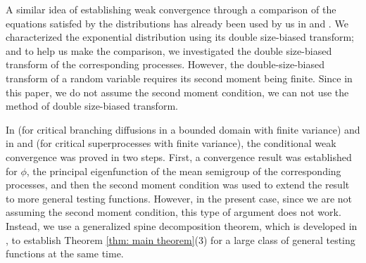 \documentclass[12pt, a4paper]{amsart}
\theoremstyle{definition}
\numberwithin{equation}{section}
\begin{document}
	A similar idea of establishing weak convergence through a comparison of the equations satisfed by the distributions has already been used by us in \cite{RenSongSun2017A-2-spine} and \cite{RenSongSun2017Spine}.
	We characterized the exponential distribution 
	using its double size-biased transform;
	and to help us make the comparison, we investigated the double size-biased transform of the corresponding processes.
	However, the 
	double-size-biased transform of a random variable requires its second moment being finite.
	Since in this paper, we do not assume the second moment condition, we can not use the method of double size-biased transform.
	
	In \cite{Powell2015An-invariance} (for critical branching diffusions in a bounded domain with finite variance) and in \cite{RenSongSun2017Spine} and
	\cite{RenSongZhang2015Limit} (for critical superprocesses with finite variance), the conditional weak convergence was proved in two steps.
    First, a convergence result was established for $\phi$, the principal eigenfunction of the mean semigroup of the corresponding processes, and then the second moment condition was used to extend the result to 
    more general testing functions.
	However, in the present case, since we are not assuming the second moment condition, this type of argument does not work.
	Instead, we use a generalized spine decomposition theorem, which is developed in \cite{RenSongSun2017Spine}, to establish Theorem \ref{thm: main theorem}(3) for 
	a large class of general testing functions at the same time.
	
\end{document}
